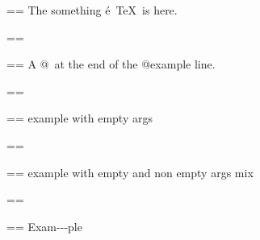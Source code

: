 \documentclass{book}
\makeatletter
\newenvironment{Texinfopreformatted}{%
  \par\GNUTobeylines\obeyspaces\frenchspacing\parskip=\z@\parindent=\z@}{}
{\catcode`\^^M=13 \gdef\GNUTobeylines{\catcode`\^^M=13 \def^^M{\null\par}}}
\newenvironment{Texinfoindented}{\begin{list}{}{}\item\relax}{\end{list}}
\renewcommand{\_}{\Texinfounderscore\discretionary{}{}{}}
\makeatother
\begin{document}
\begin{Texinfoindented}
\begin{Texinfoindented}
\begin{Texinfopreformatted}
\ttfamily The something \'{e}\ \TeX{}\ is here.
\end{Texinfopreformatted}
\end{Texinfoindented}
\begin{Texinfopreformatted}%
\ttfamily 
\end{Texinfopreformatted}
\begin{Texinfoindented}
\begin{Texinfopreformatted}%
\ttfamily A @\ at the end of the @example line.
\end{Texinfopreformatted}
\end{Texinfoindented}
\begin{Texinfopreformatted}%
\ttfamily 
\end{Texinfopreformatted}
\begin{Texinfoindented}
\begin{Texinfopreformatted}%
\ttfamily example with empty args
\end{Texinfopreformatted}
\end{Texinfoindented}
\begin{Texinfopreformatted}%
\ttfamily 
\end{Texinfopreformatted}
\begin{Texinfoindented}
\begin{Texinfopreformatted}%
\ttfamily example with empty and non empty args mix
\end{Texinfopreformatted}
\end{Texinfoindented}
\begin{Texinfopreformatted}%
\ttfamily 
\end{Texinfopreformatted}
\begin{Texinfoindented}
\begin{Texinfopreformatted}%
\ttfamily Exam{-}{-}{-}ple


\end{Texinfopreformatted}
\end{Texinfoindented}
\end{Texinfoindented}
\end{document}
